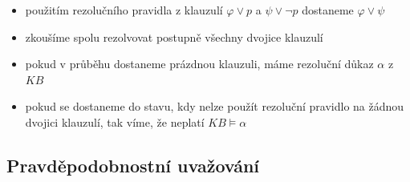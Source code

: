 \begin{itemize}
\begin{itemize}
\begin{itemize}
\item použitím rezolučního pravidla z klauzulí $\varphi\lor p$ a $\psi\lor\neg p$ dostaneme $\varphi\lor\psi$
\item zkoušíme spolu rezolvovat postupně všechny dvojice klauzulí
\item pokud v průběhu dostaneme prázdnou klauzuli, máme rezoluční důkaz $\alpha$ z $KB$
\item pokud se dostaneme do stavu, kdy nelze použít rezoluční pravidlo na žádnou dvojici klauzulí, tak víme, že neplatí $KB\models\alpha$
\end{itemize}
\end{itemize}
\end{itemize}
\subsection{Pravděpodobnostní uvažování}
